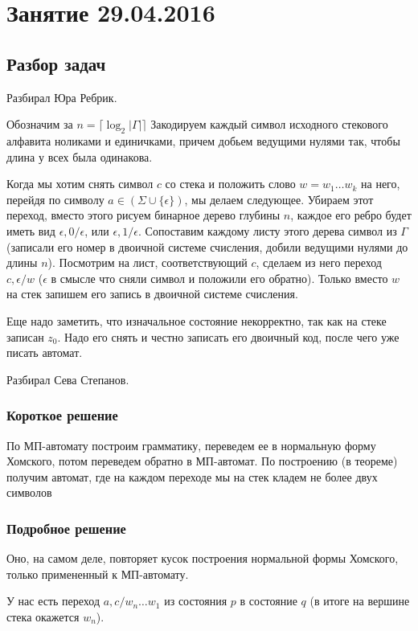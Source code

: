\chapter{Занятие 29.04.2016}
\section{Разбор задач}

Разбирал Юра Ребрик.

Обозначим за $n = \lceil \log_2 |\Gamma| \rceil$ 
Закодируем каждый символ исходного стекового алфавита ноликами и единичками, причем добьем ведущими нулями так, чтобы длина у всех была одинакова.

Когда мы хотим снять символ $c$ со стека и положить слово $w = w_1 \dots w_k$ на него, перейдя по символу $a \in (\Sigma \cup \{\epsilon\})$, мы делаем следующее.
Убираем этот переход, вместо этого рисуем бинарное дерево глубины $n$, каждое его ребро будет иметь вид $\epsilon, 0/\epsilon$, или $\epsilon, 1/\epsilon$. 
Сопоставим каждому листу этого дерева символ из $\Gamma$ (записали его номер в двоичной системе счисления, добили ведущими нулями до длины $n$).
Посмотрим на лист, соответствующий $c$, сделаем из него переход $c, \epsilon/w$ ($\epsilon$ в смысле что сняли символ и положили его обратно).
Только вместо $w$ на стек запишем его запись в двоичной системе счисления.

Еще надо заметить, что изначальное состояние некорректно, так как на стеке записан $z_0$. Надо его снять и честно записать его двоичный код, после чего уже писать автомат. 


Разбирал Сева Степанов.

\subsection{Короткое решение}           

По МП-автомату построим грамматику, переведем ее в нормальную форму Хомского, потом переведем обратно в МП-автомат.
По построению (в теореме) получим автомат, где на каждом переходе мы на стек кладем не более двух символов

\subsection{Подробное решение}
Оно, на самом деле, повторяет кусок построения нормальной формы Хомского, только примененный к МП-автомату.

У нас есть переход $a, c/w_n\dots w_1$ из состояния $p$ в состояние $q$  (в итоге на вершине стека окажется $w_n$).

